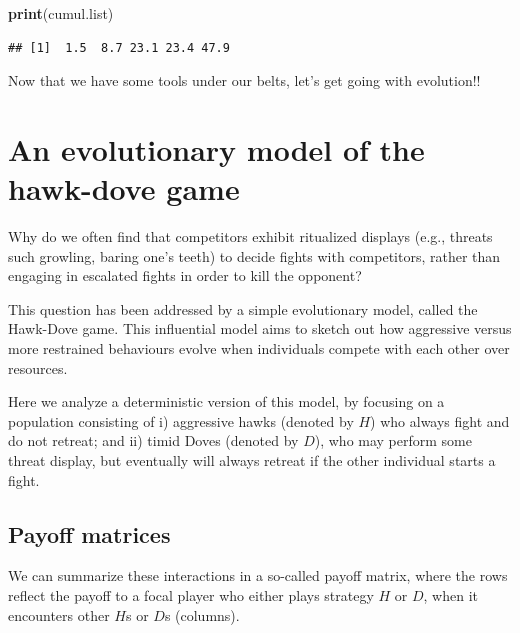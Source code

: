 \documentclass[
]{book}
\newenvironment{Shaded}{\begin{snugshade}}{\end{snugshade}}
\newcommand{\FunctionTok}[1]{\textcolor[rgb]{0.13,0.29,0.53}{\textbf{#1}}}
\newcommand{\NormalTok}[1]{#1}
\begin{document}
\begin{Shaded}
\begin{Highlighting}[]
\FunctionTok{print}\NormalTok{(cumul.list)}
\end{Highlighting}
\end{Shaded}

\begin{verbatim}
## [1]  1.5  8.7 23.1 23.4 47.9
\end{verbatim}

Now that we have some tools under our belts, let's get going with evolution!!

\chapter{An evolutionary model of the hawk-dove game}\label{an-evolutionary-model-of-the-hawk-dove-game}

Why do we often find that competitors
exhibit ritualized displays
(e.g., threats such growling, baring one's teeth)
to decide fights with competitors,
rather than engaging in escalated fights in order to kill the opponent?

This question has been addressed by a simple evolutionary model,
called the Hawk-Dove game. This influential model aims to sketch out how
aggressive versus more restrained behaviours evolve
when individuals compete with each other over resources.

Here we analyze a deterministic version of this
model, by focusing on a population consisting of i) aggressive hawks (denoted by \(H\)) who
always fight and do not retreat; and ii) timid Doves (denoted by \(D\)), who may perform some
threat display, but eventually will always retreat if the other individual
starts a fight.

\section{Payoff matrices}\label{payoff-matrices}

We can summarize these interactions in a so-called payoff matrix, where the rows
reflect the payoff to a focal player who either plays strategy \(H\) or \(D\), when it encounters other \(H\)s or \(D\)s (columns).
\end{document}
